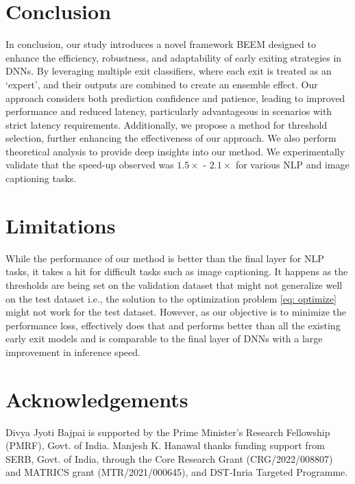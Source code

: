\section{Conclusion}
In conclusion, our study introduces a novel framework BEEM designed to enhance the efficiency, robustness, and adaptability of early exiting strategies in DNNs. By leveraging multiple exit classifiers, where each exit is treated as an `expert', and their outputs are combined to create an ensemble effect. Our approach considers both prediction confidence and patience, leading to improved performance and reduced latency, particularly advantageous in scenarios with strict latency requirements. Additionally, we propose a method for threshold selection, further enhancing the effectiveness of our approach. We also perform theoretical analysis to provide deep insights into our method. We experimentally validate that the speed-up observed was $1.5\times$ - $2.1\times$ for various NLP and image captioning tasks.

\section{Limitations}
While the performance of our method is better than the final layer for NLP tasks, it takes a hit for difficult tasks such as image captioning. It happens as the thresholds are being set on the validation dataset that might not generalize well on the test dataset i.e., the solution to the optimization problem \ref{eq: optimize} might not work for the test dataset. However, as our objective is to minimize the performance loss, \algo{} effectively does that and performs better than all the existing early exit models and is comparable to the final layer of DNNs with a large improvement in inference speed.


\section*{Acknowledgements}
Divya Jyoti Bajpai is supported by the Prime Minister’s Research Fellowship (PMRF), Govt. of India.  Manjesh K. Hanawal thanks funding support from SERB, Govt. of India, through the Core Research Grant (CRG/2022/008807) and MATRICS grant (MTR/2021/000645), and DST-Inria Targeted Programme. 




